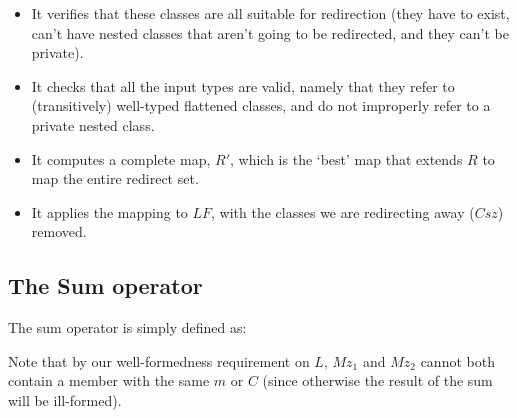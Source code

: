 \begin{itemize}
\begin{itemize}
		\item It verifies that these classes are all suitable for redirection (they have to exist, can't have nested classes that aren't going to be redirected, and they can't be private).
		\item It checks that all the input types are valid, namely that they refer to (transitively) well-typed flattened classes, and do not improperly refer to a private nested class.
		\item It computes a complete map, $R'$, which is the `best' map that extends  $R$ to map the entire redirect set.
		\item It applies the mapping to $LF$, with the classes we are redirecting away ($Csz$) removed.
	\end{itemize}
\end{itemize}

\subsection{The Sum operator}
The sum operator is simply defined as:

\begin{defs}
{}
{}
\end{defs}
Note that by our well-formedness requirement on $L$, $Mz_1$ and $Mz_2$ cannot both contain a member with the same $m$ or $C$ (since otherwise the result of the sum will be ill-formed).

